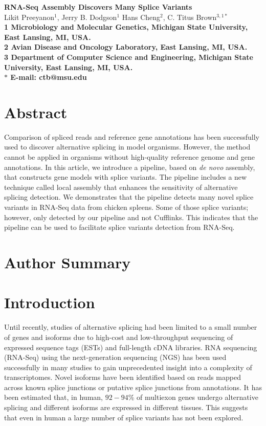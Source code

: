 \documentclass[10pt]{article}
\date{}
\begin{document}
\begin{flushleft}
{\Large
\textbf{RNA-Seq Assembly Discovers Many Splice Variants}
}
\\
Likit Preeyanon$^{1}$, 
Jerry B. Dodgson$^{1}$
Hans Cheng$^{2}$, 
C. Titus Brown$^{3,1 \ast}$
\\
\bf{1} Microbiology and Molecular Genetics, Michigan State University, East Lansing, MI, USA.
\\
\bf{2} Avian Disease and Oncology Laboratory, East Lansing, MI, USA.
\\
\bf{3} Department of Computer Science and Engineering, Michigan State University, East Lansing, MI, USA.
\\
$\ast$ E-mail: ctb@msu.edu
\end{flushleft}

\section*{Abstract}
Comparison of spliced reads and reference gene annotations has been successfully used to discover alternative
splicing in model organisms. However, the method cannot be applied in organisms without high-quality reference genome and
gene annotations. In this article, we introduce a pipeline, based on \emph{de novo} assembly, that constructs gene models with splice
variants.
The pipeline includes a new technique called local assembly that enhances the sensitivity of
alternative splicing detection.
We demonstrates that the pipeline detects many novel splice variants in RNA-Seq data from chicken spleens.
Some of those splice variants; however, only detected by our pipeline and not Cufflinks.
This indicates that the pipeline can be used to facilitate splice variants detection from RNA-Seq.
\section*{Author Summary}

\section*{Introduction}
Until recently, studies of alternative splicing had been limited to a small number of genes and isoforms due to high-cost and low-throughput sequencing of expressed sequence tags (ESTs) and full-length cDNA libraries.  
RNA sequencing (RNA-Seq) using the next-generation sequencing (NGS) has been used successfully in many studies to gain unprecedented insight into a complexity of transcriptomes.
Novel isoforms have been identified based on reads mapped across known splice junctions or putative splice junctions from annotations.
It has been estimated that, in human, $92-94$\% of multiexon genes undergo alternative splicing and different isoforms are expressed in different tissues\cite{Wang:2008ea}.
This suggests that even in human a large number of splice variants has not been explored.
\end{document}
